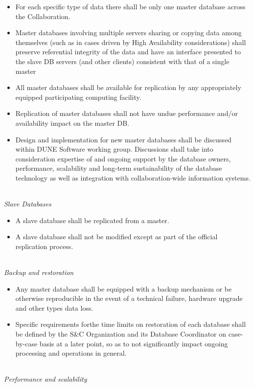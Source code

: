 \begin{itemize}
\item For each specific type of data there shall be only one master database across the Collaboration.

\item Master databases involving multiple servers sharing or copying data among themselves (such as in cases driven by High Availability considerations) shall preserve referential integrity of the data and  have an interface presented to the slave DB servers (and other clients) consistent with that of a single master

\item All master databases shall be available for replication by any appropriately equipped participating computing facility.

\item Replication of master databases shall not have undue performance and/or availability impact on the master DB.

\item Design and implementation for new master databases shall be discussed within DUNE Software working group.  Discussions shall take into
consideration expertise of and ongoing support by the database owners, performance, scalability and long-term sustainability of the database
technology as well as integration with collaboration-wide information systems.
\end{itemize}
\ 
\\
\textit{Slave Databases}
\begin{itemize}
\item A slave database shall be replicated from a master.

\item A slave database shall not be modified except as part of the official replication process.
\end{itemize}
\ 
\\
\textit{Backup and restoration}

\begin{itemize}
\item Any master database shall be equipped with a backup mechanism or be otherwise reproducible in the event of a technical failure, 
hardware upgrade and other types data loss.
\item Specific requirements forthe time limits on restoration of each database shall be defined by the S\&C Organization 
and its Database Coordinator on case-by-case basis at a later point, so as to not significantly impact ongoing processing and operations in general.
\end{itemize}
\ 
\\
\textit{Performance and scalability}

